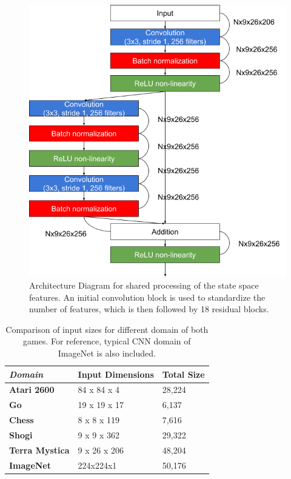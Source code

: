\documentclass[8pt,twocolumn]{article}
\begin{document}
\begin{figure}[h!]
    \centering
    \includegraphics[scale=0.3]{../figures/architecture}
    \caption{Architecture Diagram for shared processing of the state space features. An initial convolution block is used to standardize the number of features, which is then followed by 18 residual blocks.}
    \label{fig:input_architecture_diagram}
\end{figure}

\begin{table}[h!]
\begin{tabular}{|l|l|l|}
\hline
\textit{\textbf{Domain}} & \textbf{Input Dimensions} & \textbf{Total Size} \\ \hline
\textbf{Atari 2600}      & 84 x 84 x 4               & 28,224              \\ \hline
\textbf{Go}              & 19 x 19 x 17              & 6,137               \\ \hline
\textbf{Chess}           & 8 x 8 x 119               & 7,616               \\ \hline
\textbf{Shogi}           & 9 x 9 x 362               & 29,322              \\ \hline
\textbf{Terra Mystica}   & 9 x 26 x 206              & 48,204              \\ \hline
\textbf{ImageNet}        & 224x224x1                 & 50,176              \\ \hline
\end{tabular}
\caption{Comparison of input sizes for different domain of both games. For reference, typical CNN domain of ImageNet is also included.}
\label{table:input_size_comparison}
\end{table}
\end{document}
